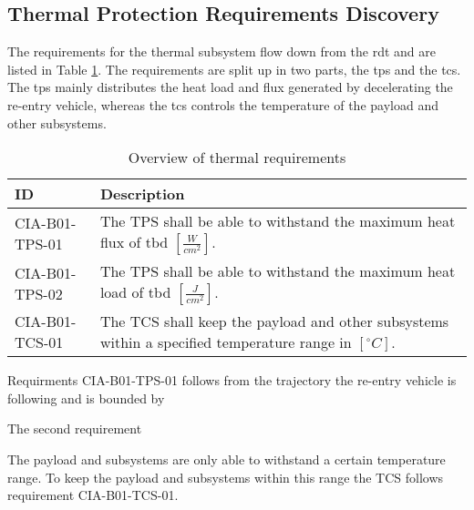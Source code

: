 \subsection{Thermal Protection Requirements Discovery} \label{sec:therm}
The requirements for the thermal subsystem flow down from the \gls{rdt} and are listed in Table \ref{tab:thermalreq}. The requirements are split up in two parts, the \gls{tps} and the \gls{tcs}. The \gls{tps} mainly distributes the heat load and flux generated by decelerating the re-entry vehicle, whereas the \gls{tcs} controls the temperature of the payload and other subsystems.


\begin{table}[H]
	\caption{Overview of thermal requirements}
	\begin{tabular}{|p{}|p{}|}
    \hline
    ID          & Description                                                                                                      \\ \hline \hline
    CIA-B01-TPS-01 & The TPS shall be able to withstand the maximum heat flux of \gls{tbd} $ \left[\frac{W}{cm^2}\right] $.               
\\ \hline
    CIA-B01-TPS-02 &  The TPS shall be able to withstand the maximum heat load of \gls{tbd} $ \left[\frac{J}{cm^2}\right] $.                
\\ \hline
    CIA-B01-TCS-01 & The TCS shall keep the payload and other subsystems within a specified temperature range in $\left[^{\circ}C\right]$.                                            
\\ \hline
    \end{tabular}
    \label{tab:thermalreq}
\end{table}

Requirments CIA-B01-TPS-01 follows from the trajectory the re-entry vehicle is following and is bounded by 

The second requirement

The payload and subsystems are only able to withstand a certain temperature range. To keep the payload and subsystems within this range the TCS follows requirement CIA-B01-TCS-01.
